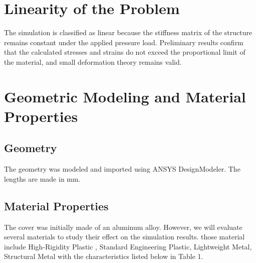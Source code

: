 \documentclass[12pt, a4paper]{article}
\begin{document}
	
	\section{Linearity of the Problem}
	
	The simulation is classified as linear because the stiffness matrix of the structure remains constant under the applied pressure load. Preliminary results confirm that the calculated stresses and strains do not exceed the proportional limit of the material, and small deformation theory remains valid.
	
	
	
	
	
	
	
	\section{Geometric Modeling and Material Properties}
	
	
	\subsection{Geometry}
	The geometry was modeled and imported using ANSYS DesignModeler. The lengths are made in mm.
	

	
	
	\subsection{Material Properties}
	The cover was initially made of an aluminum alloy. However, we will evaluate several materials to study their effect on the simulation results. those material include High-Rigidity Plastic , Standard Engineering Plastic, Lightweight Metal, Structural Metal with the characteristics listed below in Table 1. \\
	
\end{document}
